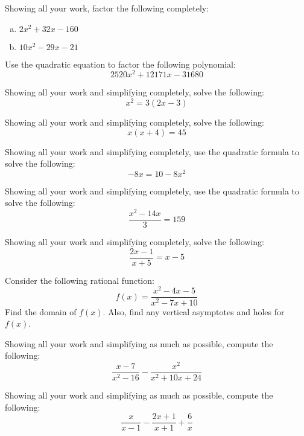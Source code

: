 \documentclass[12pt,letterpaper]{exam}
\begin{document}
\begin{questions}
\newpage
\question[10] Showing all your work, factor the following completely:
	\begin{enumerate}[(a)]
	\item $2x^2 + 32x - 160$
	\item $10x^2 - 29x - 21$
	\end{enumerate}



\newpage
\question[10] Use the quadratic equation to factor the following polynomial: 
	\[
	2520x^2 + 12171x - 31680
	\]



\newpage
\question[10] Showing all your work and simplifying completely, solve the following:
	\[
	x^2= 3(2x - 3)
	\]



\newpage
\question[10] Showing all your work and simplifying completely, solve the following:
	\[
	x(x + 4)= 45
	\]



\newpage
\question[10] Showing all your work and simplifying completely, use the quadratic formula to solve the following:
	\[
	-8x= 10 - 8x^2
	\]



\newpage
\question[10] Showing all your work and simplifying completely, use the quadratic formula to solve the following:
	\[
	\dfrac{x^2 - 14x}{3}= 159 
	\]



\newpage
\question[10] Showing all your work and simplifying completely, solve the following:
	\[
	\dfrac{2x - 1}{x + 5}= x - 5
	\]



\newpage
\question[10] Consider the following rational function:
	\[
	f(x)= \dfrac{x^2 - 4x - 5}{x^2 - 7x + 10}
	\]
Find the domain of $f(x)$. Also, find any vertical asymptotes and holes for $f(x)$. 



\newpage
\question[10] Showing all your work and simplifying as much as possible, compute the following:
	\[
	\dfrac{x - 7}{x^2 - 16} - \dfrac{x^2}{x^2 + 10x + 24}
	\]



\newpage
\question[10] Showing all your work and simplifying as much as possible, compute the following:
	\[
	\dfrac{x}{x - 1} - \dfrac{2x + 1}{x + 1} + \dfrac{6}{x}
	\]




\end{questions}
\end{document}
